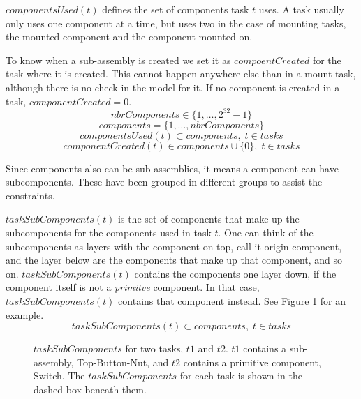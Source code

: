   $componentsUsed(t)$ defines the set of components task $t$ uses. A task usually only uses one component at a time, but uses two in the case of mounting tasks, the mounted component and the component mounted on.
  
  To know when a sub-assembly is created we set it as $compoentCreated$ for the task where it is created. This cannot happen anywhere else than in a mount task, although there is no check in the model for it. If no component is created in a task, $componentCreated=0$.
 \begin{equation}\label{eq:6}
 nbrComponents \in \{1 , \ldots , 2^{32}-1\}
 \end{equation}
 \begin{equation}\label{eq:13}
 components = \{1 , \ldots , nbrComponents\}
 \end{equation}
 \begin{equation}\label{eq:25}
 componentsUsed(t) \subset components, \; t \in tasks
 \end{equation}
 \begin{equation}\label{eq:componentCreated}
 componentCreated(t) \in components \cup \{0\}, \; t \in tasks
 \end{equation}

  \noindent Since components also can be sub-assemblies, it means a component can have subcomponents. These have been grouped in different groups to assist the constraints.

  $taskSubComponents(t)$ is the set of components that make up the subcomponents for the components used in task $t$. One can think of the subcomponents as layers with the component on top, call it origin component, and the layer below are the components that make up that component, and so on. $taskSubComponents(t)$ contains the components one layer down, if the component itself is not a \emph{primitve} component. In that case, $taskSubComponents(t)$ contains that component instead. See Figure \ref{fig:taskSubComponents} for an example.
 \begin{equation}\label{eq:53}
 taskSubComponents(t) \subset components, \; t \in tasks
 \end{equation}

 \begin{figure}
 
 \caption{$taskSubComponents$ for two tasks, $t1$ and $t2$. $t1$ contains a sub-assembly, Top-Button-Nut, and $t2$ contains a primitive component, Switch. The $taskSubComponents$ for each task is shown in the dashed box beneath them.}
 \label{fig:taskSubComponents}
 \end{figure}
 
